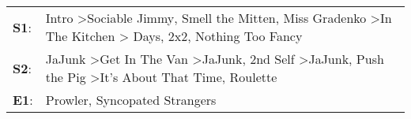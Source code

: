 \begin{supertabular}{p{0.03\textwidth}p{0.92\textwidth}}
 \textbf{S1}:  &     Intro\textsuperscript{} \textgreater \enspace Sociable Jimmy\textsuperscript{}, \enspace Smell the Mitten\textsuperscript{}, \enspace Miss Gradenko\textsuperscript{} \textgreater \enspace In The Kitchen\textsuperscript{} \textgreater {} Days\textsuperscript{}, \enspace 2x2\textsuperscript{}, \enspace Nothing Too Fancy\textsuperscript{}  \enspace  \\
 \textbf{S2}:  &  JaJunk\textsuperscript{} \textgreater \enspace Get In The Van\textsuperscript{} \textgreater \enspace JaJunk\textsuperscript{}, \enspace 2nd Self\textsuperscript{} \textgreater \enspace JaJunk\textsuperscript{}, \enspace Push the Pig\textsuperscript{} \textgreater \enspace It's About That Time\textsuperscript{}, \enspace Roulette\textsuperscript{}  \enspace  \\
 \textbf{E1}:  &                                                                                                                                                                                                                                                                                     Prowler\textsuperscript{}, \enspace Syncopated Strangers\textsuperscript{}  \enspace  \\
\end{supertabular}
